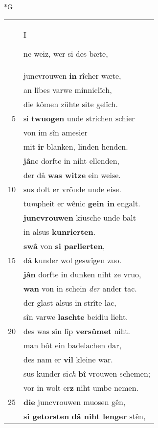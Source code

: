\documentclass[8pt,a4paper,notitlepage]{article}
\begin{document}
\newpage
\begin{table}[ht]
\begin{minipage}[t]{0.5\linewidth}
\small
\begin{center}*G
\end{center}
\begin{tabular}{rl}
 & \begin{large}I\end{large}ne weiz, wer si des bæte,\\ 
 & juncvrouwen \textbf{in} rîcher wæte,\\ 
 & an lîbes varwe minniclîch,\\ 
 & die kômen zühte site gelîch.\\ 
5 & si \textbf{twuogen} unde strichen schier\\ 
 & von im sîn amesier\\ 
 & mit \textbf{ir} blanken, linden henden.\\ 
 & \textbf{jâ}ne dorfte in niht ellenden,\\ 
 & der dâ \textbf{was witze} ein weise.\\ 
10 & sus dolt er vröude unde eise.\\ 
 & tu\textit{m}pheit er wênic \textbf{gein in} engalt.\\ 
 & \textbf{juncvrouwen} kiusche unde balt\\ 
 & in alsus \textbf{kunrierten}.\\ 
 & \textbf{swâ} von \textbf{si parlierten},\\ 
15 & dâ kunder wol geswîgen zuo.\\ 
 & \textbf{jâ}\textbf{n} dorfte in dunken niht ze vruo,\\ 
 & \textbf{wan} von in schein \textit{der} ander tac.\\ 
 & der glast alsus in strîte lac,\\ 
 & sîn varwe \textbf{laschte} beidiu lieht.\\ 
20 & des was sîn lîp \textbf{versûmet} niht.\\ 
 & man bôt ein badelachen dar,\\ 
 & des nam er \textbf{vil} kleine war.\\ 
 & sus kunder si\textit{ch} \textbf{bî} vrouwen schemen;\\ 
 & vor in wolt er\textbf{z} niht umbe nemen.\\ 
25 & \textbf{die} juncvrouwen muosen gên,\\ 
 & \textbf{si getorsten} \textbf{dâ niht lenger} stên,\\ 

\end{tabular}
\end{minipage}
\end{table}
\end{document}
